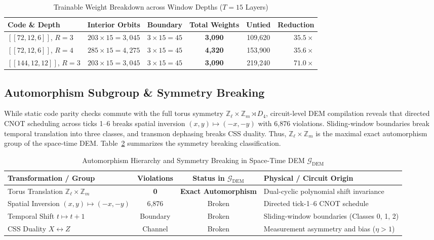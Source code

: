 \documentclass[journal]{IEEEtran}
\begin{document}
\begin{table}[h]
\centering
\caption{Trainable Weight Breakdown across Window Depths ($T=15$ Layers)}
\label{tab:parameter_accounting}
\begin{tabular}{lccccr}
\hline
\textbf{Code \& Depth} & \textbf{Interior Orbits} & \textbf{Boundary} & \textbf{Total Weights} & \textbf{Untied} & \textbf{Reduction} \\
\hline
$[[72,12,6]]$, $R=3$ & $203 \times 15 = 3,045$ & $3 \times 15 = 45$ & \textbf{3,090} & 109,620 & $\mathbf{35.5\times}$ \\
$[[72,12,6]]$, $R=4$ & $285 \times 15 = 4,275$ & $3 \times 15 = 45$ & \textbf{4,320} & 153,900 & $\mathbf{35.6\times}$ \\
$[[144,12,12]]$, $R=3$ & $203 \times 15 = 3,045$ & $3 \times 15 = 45$ & \textbf{3,090} & 219,240 & $\mathbf{71.0\times}$ \\
\hline
\end{tabular}
\end{table}

\subsection{Automorphism Subgroup \& Symmetry Breaking}
While static code parity checks commute with the full torus symmetry $\mathbb{Z}_\ell \times \mathbb{Z}_m \rtimes D_4$, circuit-level DEM compilation reveals that directed CNOT scheduling across ticks 1--6 breaks spatial inversion $(x, y) \mapsto (-x, -y)$ with 6,876 violations. Sliding-window boundaries break temporal translation into three classes, and transmon dephasing breaks CSS duality. Thus, $\mathbb{Z}_\ell \times \mathbb{Z}_m$ is the maximal exact automorphism group of the space-time DEM. Table~\ref{tab:symmetry_breaking} summarizes the symmetry breaking classification.

\begin{table}[h]
\centering
\caption{Automorphism Hierarchy and Symmetry Breaking in Space-Time DEM $\mathcal{G}_{\text{DEM}}$}
\label{tab:symmetry_breaking}
\begin{tabular}{lccl}
\hline
\textbf{Transformation / Group} & \textbf{Violations} & \textbf{Status in $\mathcal{G}_{\text{DEM}}$} & \textbf{Physical / Circuit Origin} \\
\hline
Torus Translation $\mathbb{Z}_\ell \times \mathbb{Z}_m$ & \textbf{0} & \textbf{Exact Automorphism} & Dual-cyclic polynomial shift invariance \\
Spatial Inversion $(x,y) \mapsto (-x,-y)$ & 6,876 & Broken & Directed tick-1--6 CNOT schedule \\
Temporal Shift $t \mapsto t+1$ & Boundary & Broken & Sliding-window boundaries (Classes 0, 1, 2) \\
CSS Duality $X \leftrightarrow Z$ & Channel & Broken & Measurement asymmetry and bias ($\eta > 1$) \\
\hline
\end{tabular}
\end{table}
\end{document}
